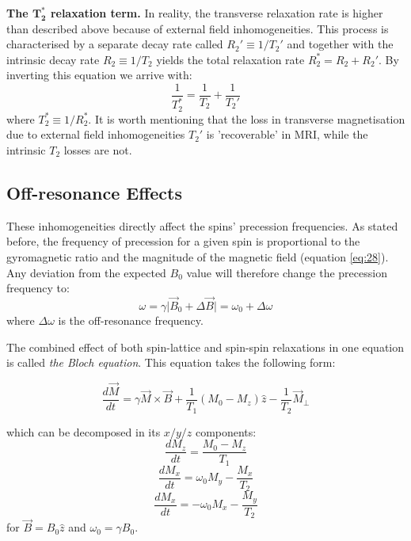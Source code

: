 \hfill

\textbf{The $\mathbf{T_2^*}$ relaxation term.} 
In reality, the transverse relaxation rate is higher than described above because of external field inhomogeneities.
This process is characterised by a separate decay rate called $R_2' \equiv 1/T_2'$ and together with the intrinsic decay rate $R_2 \equiv 1/T_2$ yields the total relaxation rate $R_2^* = R_2 + R_2'$.
By inverting this equation we arrive with:
\begin{equation} \label{eq:420}
    \frac{1}{T_2^*} = \frac{1}{T_2} + \frac{1}{T_2'}
\end{equation}
where ${T_2^*} \equiv 1/R_2^*$.
It is worth mentioning that the loss in transverse magnetisation due to external field inhomogeneities $T_2'$ is 'recoverable' in MRI, while the intrinsic $T_2$ losses are not.

\hfill

\subsection{Off-resonance Effects}

These inhomogeneities directly affect the spins' precession frequencies.
As stated before, the frequency of precession for a given spin is proportional to the gyromagnetic ratio and the magnitude of the magnetic field (equation \ref{eq:28}).
Any deviation from the expected $B_0$ value will therefore change the precession frequency to:
\begin{equation}
    \omega = \gamma \lvert \vec{B}_0 + \Delta \vec{B} \rvert = \omega_0 + \Delta \omega
\end{equation}
where $\Delta \omega$ is the off-resonance frequency.

\hfill

\label{chapterlabel2sec1Bloch}

The combined effect of both spin-lattice and spin-spin relaxations in one equation is called \textit{the Bloch equation}. 
This equation takes the following form:

\begin{equation} \label{eq:421}
    \frac{d\vec{M}}{dt} = \gamma \vec{M} \times \vec{B} + \frac{1}{T_1} (M_0 - M_z) \hat{z} - \frac{1}{T_2} \vec{M}_{\perp}
\end{equation} 

which can be decomposed in its $x/y/z$ components:
\begin{equation} \label{eq:422}
    \frac{dM_z}{dt} = \frac{M_0 - M_z}{T_1}
\end{equation}
\begin{equation} \label{eq:423}
    \frac{dM_x}{dt} = \omega_0 M_y - \frac{M_x}{T_2}
\end{equation}
\begin{equation} \label{eq:424}
    \frac{dM_x}{dt} = -\omega_0 M_x - \frac{M_y}{T_2}
\end{equation}
for $\vec{B} = B_0 \hat{z}$ and $\omega_0 = \gamma B_0$.

